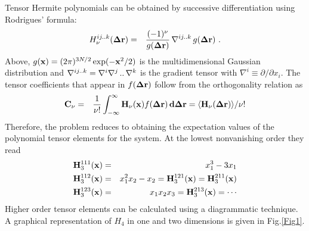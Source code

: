 \documentclass[12pt]{iopart}
\begin{document}
Tensor Hermite polynomials can be
obtained by successive differentiation using Rodrigues' formula:
\begin{eqnarray}
\label{Rodrigues}
H_{\nu}^{ij..k}({\bf \Delta r}) &=& \frac{(-1)^\nu}{g({\bf
    \Delta r})}\,{\bf\nabla}^{ij..k}\,g({\bf \Delta r})\ .
\end{eqnarray}
Above, $g({\bf x}) = (2\pi)^{3N/2}\exp(-{\bf x}^2/2)$ is the
multidimen{\-}sional Gaussian distribution and ${\bf \nabla}^{ij..k} =
\nabla^i\nabla^j\,..\,\nabla^k$ is the gradient tensor with
$\nabla^i \equiv \partial/\partial x_i$.
The tensor coefficients that appear in $f({\bf \Delta r})$
follow from the orthogonality relation as
\begin{eqnarray} 
\label{coefs}
{\bf C}_\nu &=& \frac{1}{\nu!}\int_{-\infty}^{\infty} {\bf H}_\nu({\bf x})
f({\bf\Delta r})\, {\bf d\Delta r} =  \langle {\bf H}_\nu({\bf\Delta r})\rangle/\nu!
\label{eqn:orthogonality}
\end{eqnarray}
Therefore, the problem reduces to obtaining the expectation values of
the polynomial tensor elements for the system. At the lowest
nonvanishing order they read
\begin{eqnarray}
\label{H3}
{\bf H}_3^{111}({\bf x}) &=& x_1^3 -3x_1 \nonumber \\
{\bf H}_3^{112}({\bf x}) &=& x_1^2x_2 -x_2 = {\bf H}_3^{121}({\bf x}) = {\bf
  H}_3^{211}({\bf x}) \nonumber \\
{\bf H}_3^{123}({\bf x}) &=& x_1x_2x_3 = {\bf H}_3^{213}({\bf x}) = \cdots
\end{eqnarray}
Higher order tensor elements can be calculated using a diagrammatic technique.
A graphical representation of $H_4$ in one and two dimensions is given in Fig.\ref{Fig1}. 
\end{document}
